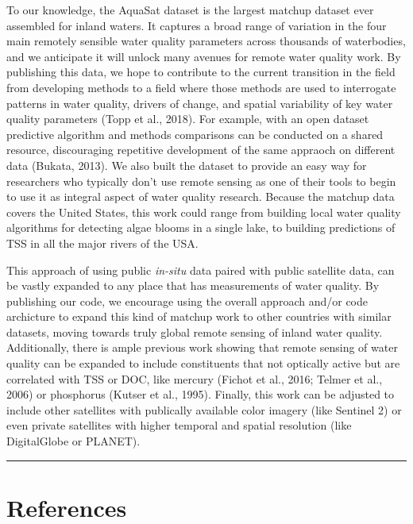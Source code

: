 \documentclass[]{article}
\begin{document}
To our knowledge, the AquaSat dataset is the largest matchup dataset
ever assembled for inland waters. It captures a broad range of variation
in the four main remotely sensible water quality parameters across
thousands of waterbodies, and we anticipate it will unlock many avenues
for remote water quality work. By publishing this data, we hope to
contribute to the current transition in the field from developing
methods to a field where those methods are used to interrogate patterns
in water quality, drivers of change, and spatial variability of key
water quality parameters (Topp et al., 2018). For example, with an open
dataset predictive algorithm and methods comparisons can be conducted on
a shared resource, discouraging repetitive development of the same
appraoch on different data (Bukata, 2013). We also built the dataset to
provide an easy way for researchers who typically don't use remote
sensing as one of their tools to begin to use it as integral aspect of
water quality research. Because the matchup data covers the United
States, this work could range from building local water quality
algorithms for detecting algae blooms in a single lake, to building
predictions of TSS in all the major rivers of the USA.

This approach of using public \emph{in-situ} data paired with public
satellite data, can be vastly expanded to any place that has
measurements of water quality. By publishing our code, we encourage
using the overall approach and/or code archicture to expand this kind of
matchup work to other countries with similar datasets, moving towards
truly global remote sensing of inland water quality. Additionally, there
is ample previous work showing that remote sensing of water quality can
be expanded to include constituents that not optically active but are
correlated with TSS or DOC, like mercury (Fichot et al., 2016; Telmer et
al., 2006) or phosphorus (Kutser et al., 1995). Finally, this work can
be adjusted to include other satellites with publically available color
imagery (like Sentinel 2) or even private satellites with higher
temporal and spatial resolution (like DigitalGlobe or PLANET).

\begin{center}\rule{0.5\linewidth}{\linethickness}\end{center}

\hypertarget{references}{%
\section*{References}\label{references}}
\end{document}
